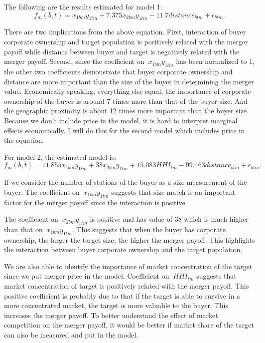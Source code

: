 \documentclass[letterpaper,12pt]{article}
\theoremstyle{definition}
\begin{document}
The following are the results estimated for model 1: 
\begin{equation*}
f_m(b, t) = x_{1bm}y_{1tm} + 7.375x_{2bm}y_{1tm} - 11.7distance_{btm} + \epsilon_{btm}.
\end{equation*}

There are two implications from the above equation. First, interaction of buyer corporate ownership and target population is positively related with the merger payoff while distance between buyer and target is negatively related with the merger payoff. Second, since the coefficient on $\ x_{1bm}y_{1tm} $ has been normalized to 1, the other two coefficients demonstrate that buyer corporate ownership and distance are more important than the size of the buyer in determining the merger value. Economically speaking, everything else equal, the importance of corporate ownership of the buyer is around 7 times more than that of the buyer size. And the geographic proximity is about 12 times more important than the buyer size. Because we don't include price in the model, it is hard to interpret marginal effects economically. I will do this for the second model which includes price in the equation.

For model 2, the estimated model is:
\begin{equation*}
f_m(b, t) = 11.855x_{1bm}y_{1tm} + 38x_{2bm}y_{1tm} + 15.083HHI_{tm} - 99.463distance_{btm} + \epsilon_{btm}.
\end{equation*}
 
If we consider the number of stations of the buyer as a size measurement of the buyer. The coefficient on $\ x_{1bm}y_{1tm} $ suggests that size match is an important factor for the merger payoff since the interaction is positive.
 
The coefficient on $\ x_{2bm}y_{1tm} $ is positive and has value of 38 which is much higher than that on $\ x_{1bm}y_{1tm} $. This suggests that when the buyer has corporate ownership, the larger the target size, the higher the merger payoff. This highlights the interaction between buyer corporate ownership and the target population. 

We are also able to identify the importance of market concentration of the target since we put merger price in the model. Coefficient on $\ HHI_{tm} $ suggests that market concentration of target is positively related with the merger payoff. This positive coefficient is probably due to that if the target is able to survive in a more concentrated market, the target is more valuable to the buyer. This increases the merger payoff. To better understand the effect of market competition on the merger payoff, it would be better if market share of the target can also be measured and put in the model.
\end{document}
